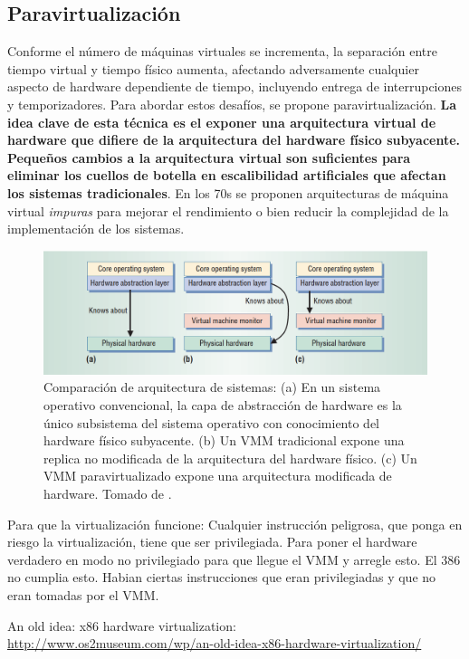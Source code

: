\documentclass[12pt, times]{simauth}
\begin{document}
\subsection{Paravirtualización}
Conforme el número de máquinas virtuales se incrementa, la separación entre tiempo virtual y tiempo físico aumenta, afectando adversamente cualquier aspecto de hardware dependiente de tiempo, incluyendo entrega de interrupciones y temporizadores. Para abordar estos desafíos, se propone paravirtualización. \textbf{La idea clave de esta técnica es el exponer una arquitectura virtual de hardware que difiere de la arquitectura del hardware físico subyacente. Pequeños cambios a la arquitectura virtual son suficientes para eliminar los cuellos de botella en escalibilidad artificiales que afectan los sistemas tradicionales}. En los 70s se proponen arquitecturas de máquina virtual \emph{impuras} para mejorar el rendimiento o bien reducir la complejidad de la implementación de los sistemas. \cite{whitaker}


\begin{figure}[h]
\centering
\includegraphics[width=1.0\textwidth]{paravirtualizacion}
\caption{Comparación de arquitectura de sistemas: (a) En un sistema operativo convencional, la capa de abstracción de hardware es la único subsistema del sistema operativo con conocimiento del hardware físico subyacente. (b) Un VMM tradicional expone una replica no modificada de la arquitectura del hardware físico. (c) Un VMM paravirtualizado expone una arquitectura modificada de hardware. Tomado de \cite{whitaker}.}
\end{figure}



Para que la virtualización funcione:
Cualquier instrucción peligrosa, que ponga en riesgo la virtualización, tiene que ser privilegiada. Para poner el hardware verdadero en modo no privilegiado para que llegue el VMM y arregle esto. El 386 no cumplia esto. Habian ciertas instrucciones que eran privilegiadas y que no eran tomadas por el VMM.

An old idea: x86 hardware virtualization:\\ \url{http://www.os2museum.com/wp/an-old-idea-x86-hardware-virtualization/}
\end{document}
